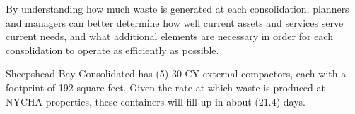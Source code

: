 
    By understanding how much waste is generated at each consolidation, planners and managers
    can better determine how well current assets and services serve current needs, and what additional 
    elements are necessary in order for each consolidation to operate as efficiently as possible. 

    Sheepshead Bay Consolidated has (5) 30-CY external compactors, each with a footprint of 192 square feet. Given the rate at which waste is produced at NYCHA properties, these containers will fill
    up in about (21.4) days.